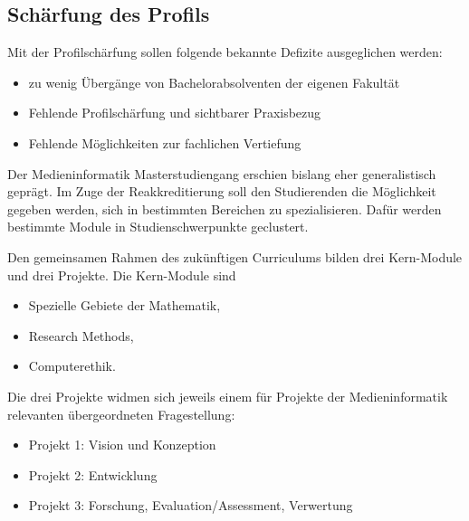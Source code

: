 \subsection{Schärfung des
Profils\label{/mi-2017/selbstbericht/0150-soll-zustand-geplante-veraenderungen/0000-geplante-veraenderungen-bachelor}}\label{schuxe4rfung-des-profilspathlabelmi-2017selbstbericht0150-soll-zustand-geplante-veraenderungen0000-geplante-veraenderungen-bachelor}

Mit der Profilschärfung sollen folgende bekannte Defizite ausgeglichen
werden:

\begin{itemize}
\tightlist
\item
  zu wenig Übergänge von Bachelorabsolventen der eigenen Fakultät
\item
  Fehlende Profilschärfung und sichtbarer Praxisbezug
\item
  Fehlende Möglichkeiten zur fachlichen Vertiefung
\end{itemize}

Der Medieninformatik Masterstudiengang erschien bislang eher
generalistisch geprägt. Im Zuge der Reakkreditierung soll den
Studierenden die Möglichkeit gegeben werden, sich in bestimmten
Bereichen zu spezialisieren. Dafür werden bestimmte Module in
Studienschwerpunkte geclustert.

Den gemeinsamen Rahmen des zukünftigen Curriculums bilden drei
Kern-Module und drei Projekte. Die Kern-Module sind

\begin{itemize}
\tightlist
\item
  Spezielle Gebiete der Mathematik,
\item
  Research Methods,
\item
  Computerethik.
\end{itemize}

Die drei Projekte widmen sich jeweils einem für Projekte der
Medieninformatik relevanten übergeordneten Fragestellung:

\begin{itemize}
\tightlist
\item
  Projekt 1: Vision und Konzeption
\item
  Projekt 2: Entwicklung
\item
  Projekt 3: Forschung, Evaluation/Assessment, Verwertung
\end{itemize}

